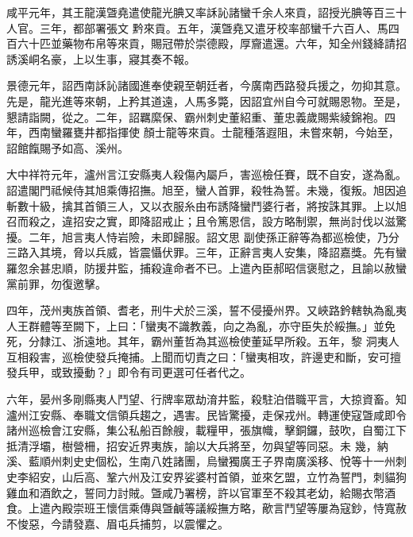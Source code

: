 \begin{pinyinscope}
 咸平元年，其王龍漢曁堯遣使龍光腆又率訸訫諸蠻千余人來貢，詔授光腆等百三十人官。三年，都部署張文
 黔來貢。五年，漢曁堯又遣牙校率部蠻千六百人、馬四百六十匹並藥物布帛等來貢，賜冠帶於崇德殿，厚齎遣還。六年，知全州錢絳請招誘溪峒名豪，上以生事，寢其奏不報。



 景德元年，詔西南訸訫諸國進奉使親至朝廷者，今廣南西路發兵援之，勿抑其意。先是，龍光進等來朝，上矜其道遠，人馬多斃，因詔宜州自今可就賜恩物。至是，懇請詣闕，從之。二年，詔羈縻保、霸州刺史董紹重、董忠義歲賜紫綾錦袍。四年，西南蠻羅甕井都指揮使
 顏士龍等來貢。士龍種落遐阻，未嘗來朝，今始至，詔館餼賜予如高、溪州。



 大中祥符元年，瀘州言江安縣夷人殺傷內屬戶，害巡檢任賽，既不自安，遂為亂。詔遣閣門祗候侍其旭乘傳招撫。旭至，蠻人首罪，殺牲為誓。未幾，復叛。旭因追斬數十級，擒其首領三人，又以衣服糸由布誘降蠻鬥婆行者，將按誅其罪。上以旭召而殺之，違招安之實，即降詔戒止；且令篤恩信，設方略制禦，無尚討伐以滋驚擾。二年，旭言夷人恃岩險，未即歸服。詔文思
 副使孫正辭等為都巡檢使，乃分三路入其境，脅以兵威，皆震懾伏罪。三年，正辭言夷人安集，降詔嘉獎。先有蠻羅忽余甚忠順，防援井監，捕殺違命者不已。上遣內臣郝昭信褒慰之，且諭以赦蠻黨前罪，勿復邀擊。



 四年，茂州夷族首領、耆老，刑牛犬於三溪，誓不侵擾州界。又峽路鈐轄執為亂夷人王群體等至闕下，上曰：「蠻夷不識教義，向之為亂，亦守臣失於綏撫。」並免死，分隸江、浙遠地。其年，霸州董哲為其巡檢使董延早所殺。五年，黎
 洞夷人互相殺害，巡檢使發兵掩捕。上聞而切責之曰：「蠻夷相攻，許邊吏和斷，安可擅發兵甲，或致擾動？」即令有司更選可任者代之。



 六年，晏州多剛縣夷人鬥望、行牌率眾劫淯井監，殺駐泊借職平言，大掠資畜。知瀘州江安縣、奉職文信領兵趨之，遇害。民皆驚擾，走保戎州。轉運使寇曁咸即令諸州巡檢會江安縣，集公私船百餘艘，載糧甲，張旗幟，擊銅鑼，鼓吹，自蜀江下抵清浮壩，樹營柵，招安近界夷族，諭以大兵將至，勿與望等同惡。未
 幾，納溪、藍順州刺史史個松，生南八姓諸團，烏蠻獨廣王子界南廣溪移、悅等十一州刺史李紹安，山后高、鞏六州及江安界娑婆村首領，並來乞盟，立竹為誓門，刺貓狗雞血和酒飲之，誓同力討賊。曁咸乃署榜，許以官軍至不殺其老幼，給賜衣幣酒食。上遣內殿崇班王懷信乘傳與曁鹹等議綏撫方略，歒言鬥望等屢為寇鈔，恃寬赦不悛惡，今請發嘉、眉屯兵捕剪，以震懼之。




\end{pinyinscope}
